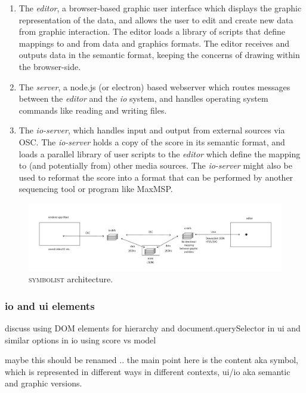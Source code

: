 \documentclass{article}
\def\symbolist{\textsc{symbolist}\xspace}
\begin{document}
\begin{enumerate}\itemsep0pt
\item The \textit{editor}, a browser-based graphic user interface which displays the graphic representation of the data, and allows the user to edit and create new data from graphic interaction. The editor loads a library of scripts that define mappings to and from data and graphics formats. The editor receives and outputs data in the semantic format, keeping the concerns of drawing within the browser-side.

\item The \textit{server}, a node.js (or electron) based webserver which routes messages between the \textit{editor} and the \textit{io} system, and handles operating system commands like reading and writing files.

\item  The \textit{io-server}, which handles input and output from external sources via OSC. The \textit{io-server} holds a copy of the score in its semantic format, and loads a parallel library of user scripts to the \textit{editor} which define the mapping to (and potentially from) other media sources. The \textit{io-server} might also be used to reformat the score into a format that can be performed by another sequencing tool or program like MaxMSP.
\end{enumerate}

\begin{figure}[ht!]
\centering
\includegraphics[width=2\columnwidth]{symbolist-architecture.pdf}
\caption{ \symbolist architecture.
\label{fig:architecture}}
\end{figure}


\subsubsection{io and ui elements}\label{subsec:io_ui_elements}

discuss using DOM elements for hierarchy and document.querySelector in ui
and similar options in io using score vs model

maybe this should be renamed ..
the main point here is the content aka symbol, which is represented in different ways in different contexts, ui/io aka semantic and graphic versions.
\end{document}
